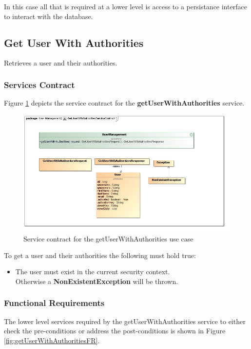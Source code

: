 In this case all that is required at a lower level is access to a persistance
interface to interact with the database.


\subsection{Get User With Authorities}
Retrieves a user and their authorities.

\subsubsection{Services Contract}
Figure \ref{fig:GetUserWithAuthoritiesServicesContract} depicts the service
contract for the \textbf{getUserWithAuthorities} service.

\begin{figure}[H]
	\begin{center}
		\includegraphics[scale=0.55]{../Diagrams and Charts/Users/GetUserWithAuthoritiesServiceContract.jpg}
		\caption{Service contract for the getUserWithAuthorities use case}
		\label{fig:GetUserWithAuthoritiesServicesContract}
	\end{center}
\end{figure}

To get a user and their authorities the following must hold true:
\begin{itemize}
	\item The user must exist in the current security context.\\
	Otherwise a \textbf{NonExistentException} will be thrown.
\end{itemize}

\subsubsection{Functional Requirements}
The lower level services required by the getUserWithAuthorities service
to either check the pre-conditions or address the post-conditions is shown
in Figure \ref{fig:getUserWithAuthoritiesFR}.

